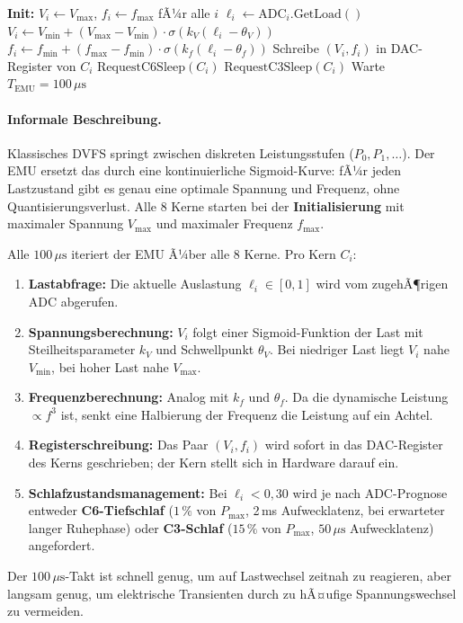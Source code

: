 ﻿\documentclass[a4paper,12pt]{scrreprt}
\theoremstyle{definition}
\begin{document}
	\begin{algorithm}[H]
		\caption{Energy Management Unit (EMU) -- Kontinuierliches DVFS}
		\label{alg:emu}
		\begin{algorithmic}[1]
			\State \textbf{Init:} $V_i \gets V_{\max}$, $f_i \gets f_{\max}$ fÃ¼r alle $i$
			\Repeat
			\State $\ell_i \gets \mathrm{ADC}_i.\mathrm{GetLoad}()$
			\State $V_i \gets V_{\min} + (V_{\max}-V_{\min}) \cdot \sigma(k_V(\ell_i - \theta_V))$
			\State $f_i \gets f_{\min} + (f_{\max}-f_{\min}) \cdot \sigma(k_f(\ell_i - \theta_f))$
			\State Schreibe $(V_i, f_i)$ in DAC-Register von $C_i$
			\State $\mathrm{RequestC6Sleep}(C_i)$
			\State $\mathrm{RequestC3Sleep}(C_i)$
			\EndIf
			\EndFor
			\State Warte $T_{\mathrm{EMU}} = 100\,\mu\mathrm{s}$
		\end{algorithmic}
	\end{algorithm}

	\paragraph{Informale Beschreibung.}
	Klassisches DVFS springt zwischen diskreten Leistungsstufen ($P_0, P_1, \ldots$).
	Der EMU ersetzt das durch eine kontinuierliche Sigmoid-Kurve: fÃ¼r jeden Lastzustand gibt es genau
	eine optimale Spannung und Frequenz, ohne Quantisierungsverlust.
	Alle 8 Kerne starten bei der \textbf{Initialisierung} mit maximaler Spannung $V_{\max}$ und
	maximaler Frequenz $f_{\max}$.

	Alle $100\,\mu\mathrm{s}$ iteriert der EMU Ã¼ber alle 8 Kerne. Pro Kern $C_i$:
	\begin{enumerate}[noitemsep]
		\item \textbf{Lastabfrage:} Die aktuelle Auslastung $\ell_i \in [0,1]$ wird vom zugehÃ¶rigen ADC
			abgerufen.
		\item \textbf{Spannungsberechnung:} $V_i$ folgt einer Sigmoid-Funktion der Last mit Steilheitsparameter
			$k_V$ und Schwellpunkt $\theta_V$. Bei niedriger Last liegt $V_i$ nahe $V_{\min}$,
			bei hoher Last nahe $V_{\max}$.
		\item \textbf{Frequenzberechnung:} Analog mit $k_f$ und $\theta_f$. Da die dynamische Leistung
			$\propto f^3$ ist, senkt eine Halbierung der Frequenz die Leistung auf ein Achtel.
		\item \textbf{Registerschreibung:} Das Paar $(V_i, f_i)$ wird sofort in das DAC-Register des Kerns
			geschrieben; der Kern stellt sich in Hardware darauf ein.
		\item \textbf{Schlafzustandsmanagement:} Bei $\ell_i < 0{,}30$ wird je nach ADC-Prognose entweder
			\textbf{C6-Tiefschlaf} ($1\,\%$ von $P_{\max}$, 2\,ms Aufwecklatenz, bei erwarteter langer
			Ruhephase) oder \textbf{C3-Schlaf} ($15\,\%$ von $P_{\max}$, $50\,\mu\mathrm{s}$
			Aufwecklatenz) angefordert.
	\end{enumerate}
	Der $100\,\mu\mathrm{s}$-Takt ist schnell genug, um auf Lastwechsel zeitnah zu reagieren,
	aber langsam genug, um elektrische Transienten durch zu hÃ¤ufige Spannungswechsel zu vermeiden.
\end{document}

